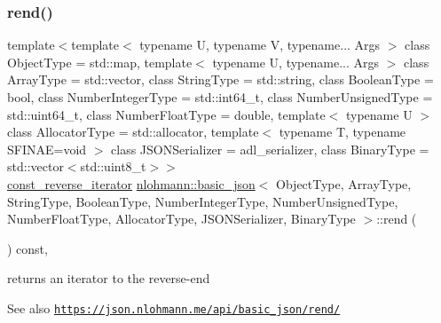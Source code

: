 \subsubsection{\texorpdfstring{rend()}{rend()}\hspace{0.1cm}{\footnotesize\ttfamily [2/2]}}
{\footnotesize\ttfamily template$<$template$<$ typename U, typename V, typename... Args $>$ class Object\+Type = std\+::map, template$<$ typename U, typename... Args $>$ class Array\+Type = std\+::vector, class String\+Type  = std\+::string, class Boolean\+Type  = bool, class Number\+Integer\+Type  = std\+::int64\+\_\+t, class Number\+Unsigned\+Type  = std\+::uint64\+\_\+t, class Number\+Float\+Type  = double, template$<$ typename U $>$ class Allocator\+Type = std\+::allocator, template$<$ typename T, typename S\+F\+I\+N\+A\+E=void $>$ class J\+S\+O\+N\+Serializer = adl\+\_\+serializer, class Binary\+Type  = std\+::vector$<$std\+::uint8\+\_\+t$>$$>$ \\
\hyperlink{classnlohmann_1_1basic__json_aa7dba16ed9ee97380aeb17a207dd919a}{const\+\_\+reverse\+\_\+iterator} \hyperlink{classnlohmann_1_1basic__json}{nlohmann\+::basic\+\_\+json}$<$ Object\+Type, Array\+Type, String\+Type, Boolean\+Type, Number\+Integer\+Type, Number\+Unsigned\+Type, Number\+Float\+Type, Allocator\+Type, J\+S\+O\+N\+Serializer, Binary\+Type $>$\+::rend (\begin{DoxyParamCaption}{ }\end{DoxyParamCaption}) const\hspace{0.3cm}{\ttfamily [inline]}, {\ttfamily [noexcept]}}



returns an iterator to the reverse-\/end 

\begin{DoxySeeAlso}{See also}
\href{https://json.nlohmann.me/api/basic_json/rend/}{\tt https\+://json.\+nlohmann.\+me/api/basic\+\_\+json/rend/} 
\end{DoxySeeAlso}
\mbox{\label{classnlohmann_1_1basic__json_a12b382c6407da5543827ce4b24bb5008}} 
